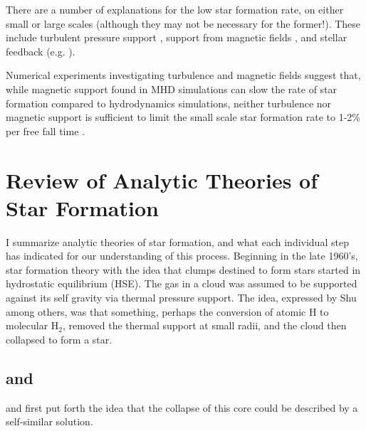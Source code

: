 \documentclass[../dissertation.tex]{subfiles}
\begin{document}
There are a number of explanations for the low star formation rate, on 
either small or large scales (although they may not be necessary for the former!). 
These include turbulent pressure support \citep{1992ApJ...396..631M}, support from magnetic fields
\citep{1966MNRAS.132..359S,1976ApJ...207..141M}, and stellar feedback (e.g.
\citealt{1986ApJ...303...39D}).  


Numerical experiments investigating turbulence and magnetic fields suggest that, while magnetic support found in MHD simulations can slow the rate of star formation 
compared to hydrodynamics simulations, neither turbulence nor magnetic support is sufficient to limit the small scale star formation rate to 1-2\% per free fall time
\citep{2010ApJ...709...27W,2011MNRAS.410L...8C,2011ApJ...730...40P,2012ApJ...754...71K,2014MNRAS.439.3420M,2015ApJ...808...48B,2017ApJ...838...40M}.


\section{Review of Analytic Theories of Star Formation} \label{sec:sf_review}
I summarize analytic theories of star formation, and what each individual step has indicated for our understanding of this process.
Beginning in the late 1960's, star formation theory with the idea that clumps destined to form stars started in hydrostatic equilibrium (HSE). The gas in a cloud was assumed to be supported against its self gravity via thermal pressure support. 
The idea, expressed by Shu among others, was that something, perhaps the conversion of atomic H to molecular H$_2$, removed the thermal support at small radii, and the cloud then collapsed to form a star.

\subsection{\citet{1969MNRAS.145..271L} and \citet{1969MNRAS.144..425P}}
\citet{1969MNRAS.145..271L} and \citet{1969MNRAS.144..425P} first put forth the idea that the collapse of this core could be described by a self-similar solution. 
\end{document}
